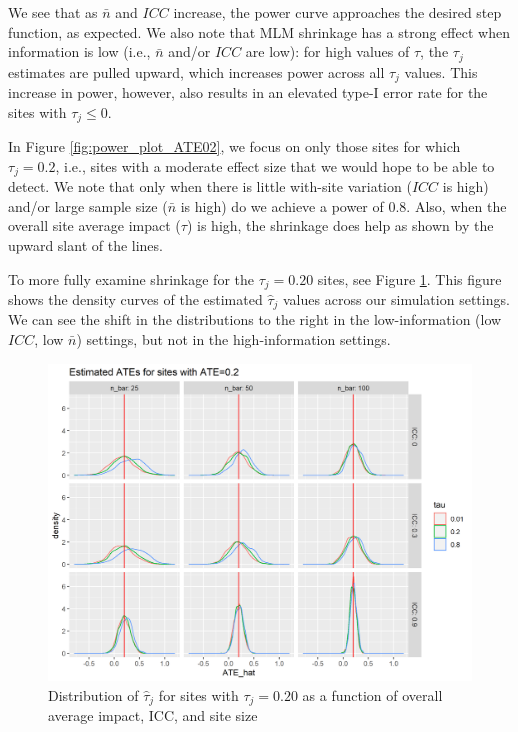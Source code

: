 \documentclass[]{article}
\begin{document}
	We see that as $\bar{n}$ and $ICC$ increase, the power curve approaches the desired step function, as expected.
	We also note that MLM shrinkage has a strong effect when information is low (i.e., $\bar{n}$ and/or $ICC$ are low): for high values of $\tau$, the $\tau_j$ estimates are pulled upward, which increases power across all $\tau_j$ values.
	This increase in power, however, also results in an elevated type-I error rate for the sites with $\tau_j \leq 0$.
	
	
	In Figure \ref{fig:power_plot_ATE02}, we focus on only those sites for which $\tau_j = 0.2$, i.e., sites with a moderate effect size that we would hope to be able to detect.
	We note that only when there is little with-site variation ($ICC$ is high) and/or large sample size ($\bar{n}$ is high) do we achieve a power of 0.8.
	Also, when the overall site average impact ($\tau$) is high, the shrinkage does help as shown by the upward slant of the lines.
	
	To more fully examine shrinkage for the $\tau_j = 0.20$ sites, see Figure \ref{fig:power_plot_ATE02_dens}.
	This figure shows the density curves of the estimated $\hat{\tau}_j$ values across our simulation settings.
	We can see the shift in the distributions to the right in the low-information (low $ICC$, low $\bar{n}$) settings, but not in the high-information settings.
	
	\begin{figure}[ht]
		\centering
		\includegraphics[width=\textwidth]{power_plot_ATE02_dens}
		\caption{Distribution of $\hat{\tau}_j$ for sites with $\tau_j = 0.20$ as a function of overall average impact, ICC, and site size}
		\label{fig:power_plot_ATE02_dens}
	\end{figure}
	
\end{document}
